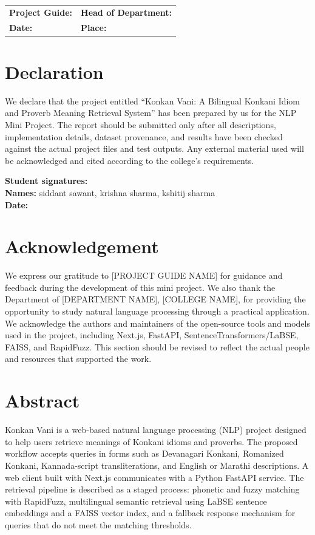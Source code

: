 \documentclass[12pt,a4paper]{report}
\begin{document}
\vspace{2cm}
\noindent
\begin{tabularx}{\textwidth}{XX}
    \textbf{Project Guide:} & \textbf{Head of Department:}\\[2cm]
    \textbf{Date:} & \textbf{Place:}\\
\end{tabularx}
\clearpage

\chapter*{Declaration}
We declare that the project entitled ``Konkan Vani: A Bilingual Konkani Idiom and
Proverb Meaning Retrieval System'' has been prepared by us for the NLP Mini
Project. The report should be submitted only after all descriptions,
implementation details, dataset provenance, and results have been checked against
the actual project files and test outputs. Any external material used will be
acknowledged and cited according to the college's requirements.

\vspace{1cm}
\noindent \textbf{Student signatures:}\\[0.3cm]
\textbf{Names:} siddant sawant, krishna sharma, kshitij sharma\\[0.5cm]
\textbf{Date:}
\clearpage

\chapter*{Acknowledgement}
We express our gratitude to [PROJECT GUIDE NAME] for guidance and feedback during
the development of this mini project. We also thank the Department of
[DEPARTMENT NAME], [COLLEGE NAME], for providing the opportunity to study natural
language processing through a practical application. We acknowledge the authors
and maintainers of the open-source tools and models used in the project, including
Next.js, FastAPI, SentenceTransformers/LaBSE, FAISS, and RapidFuzz. This section
should be revised to reflect the actual people and resources that supported the
work.
\clearpage

\chapter*{Abstract}
Konkan Vani is a web-based natural language processing (NLP) project designed to
help users retrieve meanings of Konkani idioms and proverbs. The proposed workflow
accepts queries in forms such as Devanagari Konkani, Romanized Konkani,
Kannada-script transliterations, and English or Marathi descriptions. A web client
built with Next.js communicates with a Python FastAPI service. The retrieval
pipeline is described as a staged process: phonetic and fuzzy matching with
RapidFuzz, multilingual semantic retrieval using LaBSE sentence embeddings and a
FAISS vector index, and a fallback response mechanism for queries that do not meet
the matching thresholds.
\end{document}
